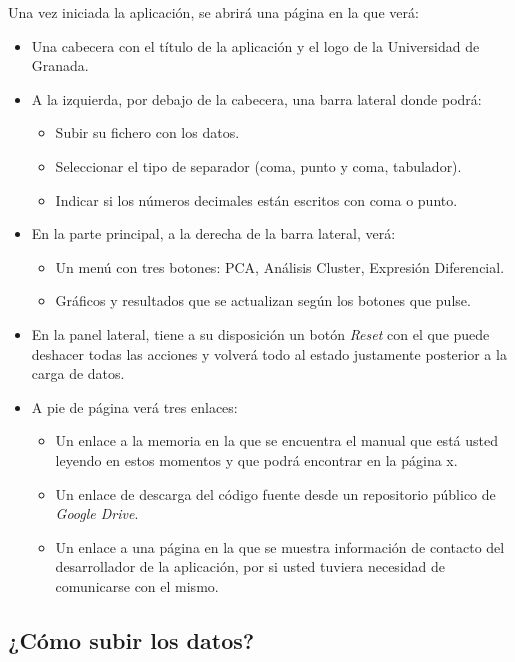 Una vez iniciada la aplicación, se abrirá una página en la que verá:

\begin{itemize}
    \item Una cabecera con el título de la aplicación y el logo de la Universidad de Granada.
    \item A la izquierda, por debajo de la cabecera, una barra lateral donde podrá:
    \begin{itemize}
        \item Subir su fichero con los datos.
        \item Seleccionar el tipo de separador (coma, punto y coma, tabulador).
        \item Indicar si los números decimales están escritos con coma o punto.
    \end{itemize}
    \item En la parte principal, a la derecha de la barra lateral, verá:
    \begin{itemize}
        \item Un menú con tres botones: PCA, Análisis Cluster, Expresión Diferencial.
        \item Gráficos y resultados que se actualizan según los botones que pulse.
    \end{itemize}
    \item En la panel lateral, tiene a su disposición un botón \textit{Reset} con el que puede deshacer 
    todas las acciones y volverá todo al estado justamente posterior a la carga de datos.
    \item A pie de página verá tres enlaces:
    \begin{itemize}
        \item Un enlace a la memoria en la que se encuentra el manual que está usted leyendo en estos momentos
        y que podrá encontrar en la página x.
        \item Un enlace de descarga del código fuente desde un repositorio público de \textit{Google Drive}.
        \item Un enlace a una página en la que se muestra información de contacto del desarrollador de la aplicación,
        por si usted tuviera necesidad de comunicarse con el mismo.
    \end{itemize}
\end{itemize}

\subsection{¿Cómo subir los datos?}


